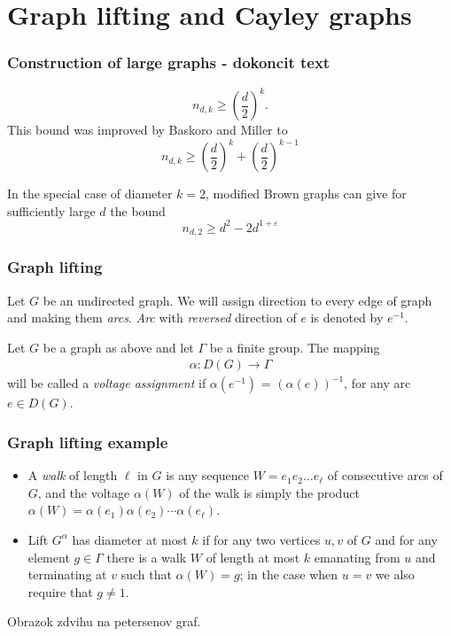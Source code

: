 \documentclass{beamer}
\begin{document}
\section{Graph lifting and Cayley graphs} 
\begin{frame}
	\frametitle{Construction of large graphs - dokoncit text}
	\begin{equation*}
		n_{d,k} \geq \left( \frac{d}{2} \right)^{k}.
    \end{equation*}
    This bound was improved by Baskoro and Miller \cite{Bas-Mil} to
    \begin{equation}
        n_{d,k} \geq \left( \frac{d}{2} \right)^{k} +  \left( \frac{d}{2} \right)^{k-1}
    \end{equation}
    
    In the special case of diameter $k=2$, modified Brown graphs can give for sufficiently large $d$ the bound
    \begin{equation*}
        n_{d,2} \geq d^{2} - 2d^{1+\varepsilon}
    \end{equation*}

\end{frame}
\begin{frame}
	\frametitle{Graph lifting}
	Let $G$ be an undirected graph. We will assign direction to every edge of graph and making them {\em arcs}. {\em Arc} with {\em reversed} direction of $e$ is denoted by $e^{-1}$. 
	\begin{definition}
		Let $G$ be a graph as above and let $\Gamma$ be a finite group. The mapping
		\begin{align*}
			\alpha: D(G) \rightarrow \Gamma
		\end{align*}
		will be called a {\em voltage assignment} if $\alpha(e^{-1})$ = $(\alpha(e))^{-1}$, for any arc $e \in D(G)$.
	\end{definition}
\end{frame}
\begin{frame}
	\frametitle{Graph lifting example}
		\begin{itemize}
			\item A {\em walk} of length $\ell$ in $G$ is any sequence $W=e_1e_2\ldots e_{\ell}$ of consecutive arcs of $G$, and the voltage $\alpha(W)$ of the walk is simply the product $\alpha(W)=\alpha(e_1)\alpha(e_2)\cdots \alpha(e_{\ell})$. \\
			\item Lift $G^{\alpha}$ has diameter at most $k$ if for any two vertices $u,v$ of $G$ and for any element $g\in \Gamma$ there is a walk $W$ of length at most $k$ emanating from $u$ and terminating at $v$ such that $\alpha(W)=g$; in the case when $u=v$ we also require that $g\ne 1$.
		\end{itemize}
 		Obrazok zdvihu na petersenov graf.

\end{frame}
\end{document}
